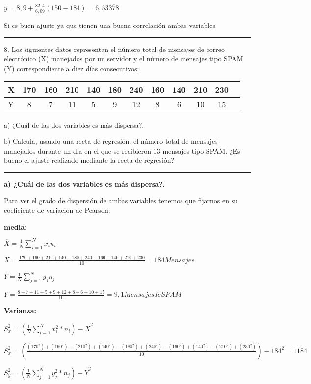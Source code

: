 \documentclass{article}
\begin{document}
\(y = 8,9 + \frac{82,4}{6,09}(150 - 184) = 6,53\overline{378}\)

Si es buen ajuste ya que tienen una buena correlaci\'on ambas variables

\rule{119mm}{0.5mm}

8. Los siguientes datos representan el n\'umero total de mensajes de correo electr\'onico (X) manejados por un servidor y el n\'umero  de mensajes tipo SPAM (Y) correspondiente a diez d\'ias consecutivos:

\begin{tabular}{|l|c|c|c|c|c|c|c|c|c|c|c|}
X & 170 & 160 & 210 & 140 & 180 & 240 & 160 & 140 & 210 & 230\\
\hline
Y  & 8 & 7 & 11 & 5 & 9 & 12 & 8 & 6 & 10 & 15\\
\end{tabular}

a) ¿Cu\'al de las dos variables es m\'as dispersa?.

b) Calcula, usando una recta de regresi\'on, el n\'umero total de mensajes manejados durante un d\'ia en el que se recibieron 13 mensajes tipo SPAM. ¿Es bueno el ajuste realizado mediante la recta de regresi\'on?

\rule{119mm}{0.2mm}

\textbf{a) ¿Cu\'al de las dos variables es m\'as dispersa?.}

Para ver el grado de dispersi\'on de ambas variables tenemos que fijarnos en su coeficiente de variacion de Pearson:

\textbf{media:}

\(\overline{X} = \frac{1}{N} \displaystyle\sum_{i=1}^{N} x_{i} n_{i}\)

\(\overline{X} = \frac{170 + 160 + 210 + 140 + 180 + 240 + 160 + 140 + 210 + 230}{10} = 184 Mensajes\)

\(\overline{Y} = \frac{1}{N} \displaystyle\sum_{j=1}^{N} y_{j} n_{j}\)

\(\overline{Y} = \frac{8 + 7 + 11 + 5 + 9 + 12 + 8 + 6 + 10 + 15}{10} = 9,1 Mensajes de SPAM\)

\textbf{Varianza:}

\(S_{x}^2  = (\frac{1}{N} \displaystyle\sum_{i=1}^{N} x_{i} ^2 * n_{i}) - \overline{X}^2\)

\(S_{x}^2 = (\frac{(170^2) + (160^2) + (210^2) + (140^2) + (180^2) + (240^2) + (160^2) +(140^2) +(210^2) + (230^2) }{10}) - 184^2 = 1184\)

\(S_{y}^2  = (\frac{1}{N} \displaystyle\sum_{j=1}^{N} y_{j} ^2 * n_{j}) - \overline{Y}^2\)
\end{document}
